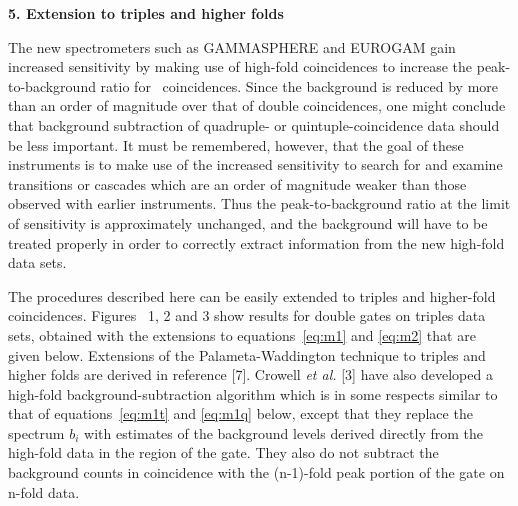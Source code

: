 \begin{center}
{\bf                 5. Extension to triples and higher folds}
\end{center}

The new spectrometers such as GAMMASPHERE and EUROGAM gain increased
sensitivity by making use of high-fold coincidences to increase the
peak-to-background ratio for \ghray\ coincidences. Since the background is
reduced by more than an order of magnitude over that of double coincidences,
one might conclude that background subtraction of quadruple- or
quintuple-coincidence data should be less important. It must be remembered,
however, that the goal of these instruments is to make use of the increased
sensitivity to search for and examine transitions or cascades which are an
order of magnitude weaker than those observed with earlier instruments. Thus
the peak-to-background ratio at the limit of sensitivity is approximately
unchanged, and the background will have to be treated properly in order to
correctly extract information from the new high-fold data sets.

The procedures described here can be easily extended to triples and higher-fold
coincidences. Figures~ 1, 2 and 3 show results for double gates on triples data
sets, obtained with the extensions to equations~\ref{eq:m1} and \ref{eq:m2}
that are given below. Extensions of the Palameta-Waddington technique to
triples and higher folds are derived in reference [7]. Crowell {\em et al.} [3]
have also developed a high-fold background-subtraction algorithm which is in
some respects similar to that of equations~\ref{eq:m1t} and \ref{eq:m1q} below,
except that they replace the spectrum $b_i$ with estimates of the background
levels derived directly from the high-fold data in the region of the gate. They
also do not subtract the background counts in coincidence with the (n-1)-fold
peak portion of the gate on n-fold data.

